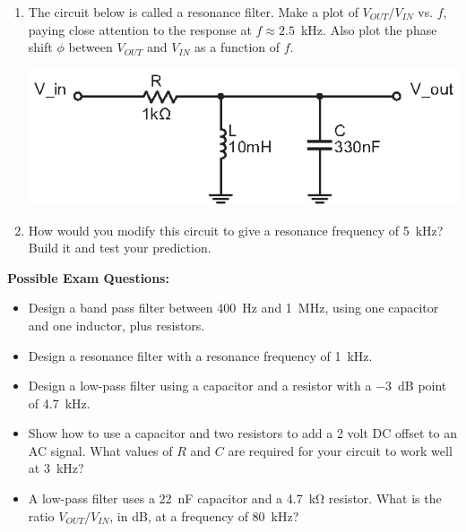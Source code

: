 \begin{enumerate}[wide]
\item The circuit below is called a resonance filter.  Make a plot of $V_{OUT}/V_{IN}$ vs. $f$, paying close attention to the response at $f \approx 2.5$~kHz.  Also plot the phase shift $\phi$ between $V_{OUT}$ and $V_{IN}$ as a function of $f$. 
\begin{center}
\includegraphics{filters/LC_resonance_filter.eps}
\end{center}

\item How would you modify this circuit to give a resonance frequency of 5~kHz?   Build it and test your prediction.


\end{enumerate}

\textbf{Possible Exam Questions:}

\begin{itemize}

\item Design a band pass filter between 400~Hz and 1~MHz, using one capacitor and one inductor, plus resistors.

\item Design a resonance filter with a resonance frequency of 1~kHz. 

\item Design a low-pass filter using a capacitor and a resistor with a $-3$~dB point of 4.7~kHz.

\item Show how to use a capacitor and two resistors to add a 2 volt DC offset to an AC signal.  What values of $R$ and $C$ are required for your circuit to work well at 3~kHz?

\item A low-pass filter uses a 22~nF capacitor and a 4.7~kΩ resistor.  What is the ratio $V_{OUT}/V_{IN}$, in dB, at a frequency of 80~kHz?

\end{itemize}





